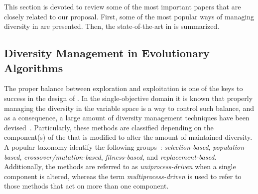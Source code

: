 This section is devoted to review some of the most important papers that are closely related to our proposal.
%
First, some of the most popular ways of managing diversity in \EAS{} are presented.
%
Then, the state-of-the-art in \MOEAS{} is summarized.

\subsection{Diversity Management in Evolutionary Algorithms}

The proper balance between exploration and exploitation is one of the keys to success in the design of \EAS{}.
%
In the single-objective domain it is known that properly managing the diversity in the variable space is a way to control such balance,
and as a consequence, a large amount of diversity management techniques have been devised~\cite{Mohan:14}.
%
Particularly, these methods are classified depending on the component(s) of the \EA{} that is modified to alter the 
amount of maintained diversity.
%
A popular taxonomy identify the following groups~\cite{Joel:Crepinsek}: \textit{selection-based}, \textit{population-based}, 
\textit{crossover/mutation-based}, \textit{fitness-based}, and \textit{replacement-based}.
%
Additionally, the methods are referred to as \textit{uniprocess-driven} when a single component is altered, whereas the term
\textit{multiprocess-driven} is used to refer to those methods that act on more than one component.

